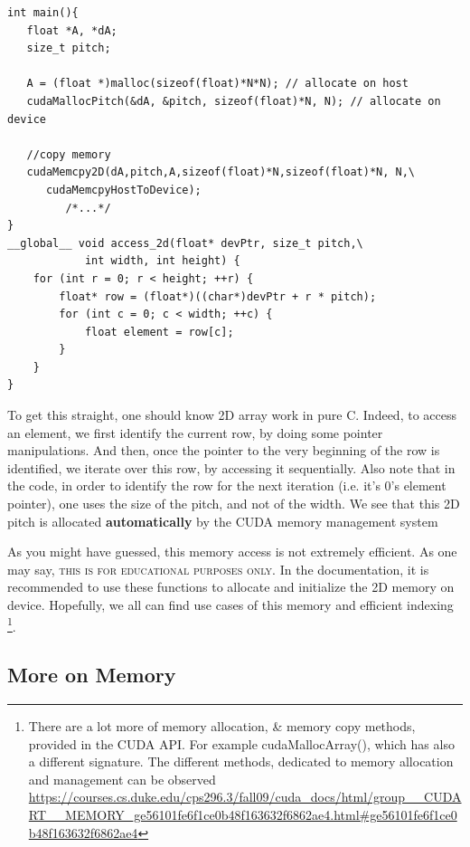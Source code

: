 \begin{listing}[!ht]
\begin{verbatim}
int main(){
   float *A, *dA;
   size_t pitch;
     
   A = (float *)malloc(sizeof(float)*N*N); // allocate on host
   cudaMallocPitch(&dA, &pitch, sizeof(float)*N, N); // allocate on device

   //copy memory
   cudaMemcpy2D(dA,pitch,A,sizeof(float)*N,sizeof(float)*N, N,\
      cudaMemcpyHostToDevice);
         /*...*/
}
__global__ void access_2d(float* devPtr, size_t pitch,\
            int width, int height) {
    for (int r = 0; r < height; ++r) {
        float* row = (float*)((char*)devPtr + r * pitch);
        for (int c = 0; c < width; ++c) {
            float element = row[c];
        }
    }
}
\end{verbatim}
\caption{To get this straight, one should know 2D array work in pure C. 
  Indeed, to access an element, we first identify the current row, by doing some pointer manipulations. 
  And then, once the pointer to the very beginning of the row is identified, we iterate over this 
  row, by accessing it sequentially. Also note that in the code, in order to identify the 
  row for the next iteration (i.e. it's $0$'s element pointer), one uses the size of the pitch, and 
  not of the width. We see that this 2D pitch is allocated 
    \textbf{automatically} by the CUDA memory management system \cite{blog_2020}
  }
\label{allocation2d}
\end{listing}


As you might have guessed, this memory access is not extremely efficient. As one may say, \textsc{this is for educational purposes only}. In the documentation, it is recommended 
to use these functions to allocate and initialize the 2D memory on device. Hopefully, we all can find 
use cases of this memory and efficient indexing \footnote{There are a lot more of memory allocation, \& memory copy methods, 
provided in the CUDA API. For example {\fontfamily{pcr}\selectfont cudaMallocArray()}, which has also a different signature.
The different methods, dedicated to memory allocation and management can be observed \url{https://courses.cs.duke.edu/cps296.3/fall09/cuda_docs/html/group__CUDART__MEMORY_ge56101fe6f1ce0b48f163632f6862ae4.html#ge56101fe6f1ce0b48f163632f6862ae4} }.

\subsection{More on Memory}
